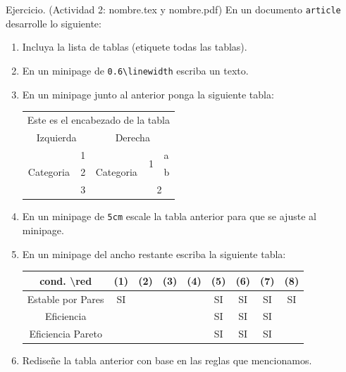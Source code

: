 \documentclass[dvipsnames,xcolor, handout]{beamer}
\theoremstyle{plain}
\theoremstyle{definition}
\begin{document}
\begin{frame}[fragile]{Ejercicio. (Actividad 2: nombre.tex y nombre.pdf)}
En un documento \verb!article! desarrolle lo siguiente:
\vspace*{-0.7cm}\begin{enumerate}
    \item Incluya la lista de tablas (etiquete todas las tablas).
    \item En un minipage de \verb!0.6\linewidth! escriba un texto.
    \item En un minipage junto al anterior ponga la siguiente tabla:
    \begin{center}
    \tiny
        \begin{tabular}{*2{c}*3{l}}\toprule
             \multicolumn{5}{c}{Este es el encabezado de la tabla}\\
             \multicolumn{2}{c}{Izquierda} & \multicolumn{3}{c}{Derecha}\\\midrule
             \multirow{3}{*}{Categoria} & 1 & \multirow{3}{*}{Categoria} & \multirow{2}{*}{1} & a \\\cmidrule{5-5}
             & 2 & & & b \\\cmidrule{4-5}
             & 3 & & \multicolumn{2}{c}{2}\\ \bottomrule 
        \end{tabular}
    \end{center}
    \item En un minipage de \verb!5cm! escale la tabla anterior para que se ajuste al minipage.
    \item En un minipage del ancho restante escriba la siguiente tabla: 
    \begin{center}
    \tiny
    \begin{tabular}{|*9{c|}}\hline
    cond. \textbackslash red & (1) & (2) & (3) & (4) & (5) & (6) & (7) & (8)\\ \hline
         Estable por Pares & SI & & & & SI & SI & SI & SI\\ \hline
         Eficiencia & & & & & SI & SI & SI & \\ \hline
         Eficiencia Pareto & & & & & SI & SI & SI & \\ \hline
    \end{tabular}
    \end{center}
    \item Rediseñe la tabla anterior con base en las reglas que mencionamos.
\end{enumerate}
\end{frame}
{
    \begin{frame}
    \vfill
    \begin{center}
    \begin{Huge}
    \end{Huge}
    \end{center}
    \vfill
     \end{frame}
}
\end{document}
